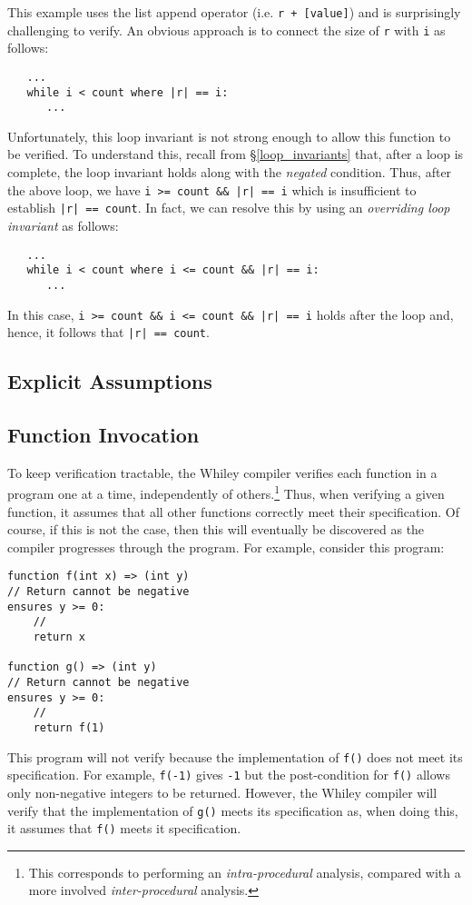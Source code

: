 This example uses the list append operator (i.e. \lstinline{r + [value]})
 and is surprisingly challenging to verify.  An obvious
approach is to connect the size of \lstinline{r} with \lstinline{i} as
follows:

\begin{lstlisting}
   ...
   while i < count where |r| == i:
      ...
\end{lstlisting}

Unfortunately, this loop invariant is not strong enough to allow this
function to be verified.  To understand this, recall from
\S\ref{loop_invariants} that, after a loop is complete, the loop
invariant holds along with the {\em negated} condition.  Thus, after
the above loop, we have \lstinline{i >= count && |r| == i} which is
insufficient to establish \lstinline{|r| == count}.  In fact, we can
resolve this by using an {\em overriding loop invariant} as follows:

\begin{lstlisting}
   ...
   while i < count where i <= count && |r| == i:
      ...
\end{lstlisting}

In this case, \lstinline{i >= count && i <= count && |r| == i} holds
after the loop and, hence, it follows that \lstinline{|r| == count}.

\subsection{Explicit Assumptions}

\subsection{Function Invocation}

To keep verification tractable, the Whiley compiler verifies each
function in a program one at a time, independently of
others.\footnote{This corresponds to performing an {\em
    intra-procedural} analysis, compared with a more involved {\em
    inter-procedural} analysis.}  Thus, when verifying a given
function, it assumes that all other functions correctly meet their
specification.  Of course, if this is not the case, then this will
eventually be discovered as the compiler progresses through the
program.  For example, consider this program:

\begin{lstlisting}
function f(int x) => (int y)
// Return cannot be negative
ensures y >= 0:
    //
    return x

function g() => (int y)
// Return cannot be negative
ensures y >= 0:
    //
    return f(1)
\end{lstlisting}

This program will not verify because the implementation of
\lstinline{f()} does not meet its specification.  For example,
\lstinline{f(-1)} gives \lstinline{-1} but the post-condition for
\lstinline{f()} allows only non-negative integers to be returned.
However, the Whiley compiler will verify that the implementation of
\lstinline{g()} meets its specification as, when doing this, it
assumes that \lstinline{f()} meets it specification.
